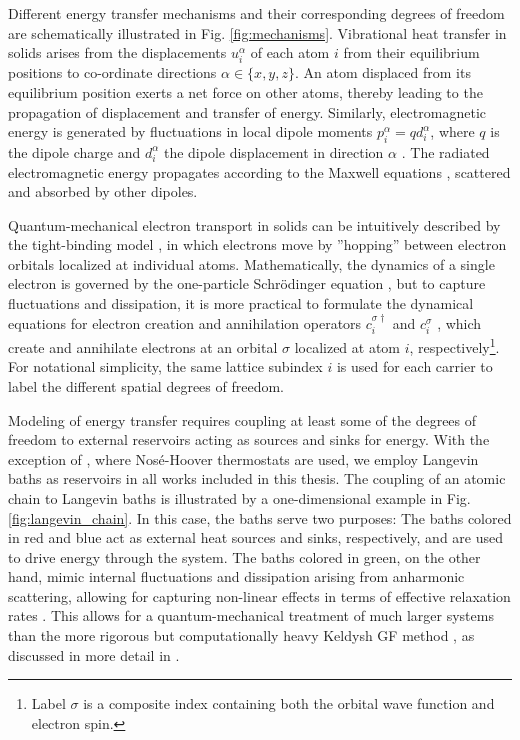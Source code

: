 Different energy transfer mechanisms and their corresponding degrees of freedom are schematically illustrated in Fig. \ref{fig:mechanisms}. Vibrational heat transfer in solids arises from the displacements $u_i^{\alpha}$ of each atom $i$ from their equilibrium positions to co-ordinate directions $\alpha\in\{x,y,z\}$. An atom displaced from its equilibrium position exerts a net force on other atoms, thereby leading to the propagation of displacement and transfer of energy. Similarly, electromagnetic energy is generated by fluctuations in local dipole moments $p_i^{\alpha}=qd_i^{\alpha}$, where $q$ is the dipole charge and $d_i^{\alpha}$ the dipole displacement in direction $\alpha$ \cite{rosa10}. The radiated electromagnetic energy propagates according to the Maxwell equations \cite{novotny}, scattered and absorbed by other dipoles. 

Quantum-mechanical electron transport in solids can be intuitively described by the tight-binding model \cite{ashcroftmermin}, in which electrons move by ''hopping'' between electron orbitals localized at individual atoms. Mathematically, the dynamics of a single electron is governed by the one-particle Schr\"odinger equation \cite{griffiths_qm}, but to capture fluctuations and dissipation, it is more practical to formulate the dynamical equations for electron creation and annihilation operators $c_i^{\sigma\dagger}$ and $c_i^{\sigma}$ \cite{ballentine}, which create and annihilate electrons at an orbital $\sigma$ localized at atom $i$, respectively\footnote{Label $\sigma$ is a composite index containing both the orbital wave function and electron spin.}. For notational simplicity, the same lattice subindex $i$ is used for each carrier to label the different spatial degrees of freedom. 

Modeling of energy transfer requires coupling at least some of the degrees of freedom to external reservoirs acting as sources and sinks for energy. With the exception of , where Nos\'e-Hoover thermostats \cite{nose84,hoover85} are used, we employ Langevin baths as reservoirs in all works included in this thesis. The coupling of an atomic chain to Langevin baths is illustrated by a one-dimensional example in Fig. \ref{fig:langevin_chain}. In this case, the baths serve two purposes: The baths colored in red and blue act as external heat sources and sinks, respectively, and are used to drive energy through the system. The baths colored in green, on the other hand, mimic internal fluctuations and dissipation arising from anharmonic scattering, allowing for capturing non-linear effects in terms of effective relaxation rates \cite{bolsterli70}. This allows for a quantum-mechanical treatment of much larger systems than the more rigorous but computationally heavy Keldysh GF method \cite{haugjauho}, as discussed in more detail in . 

